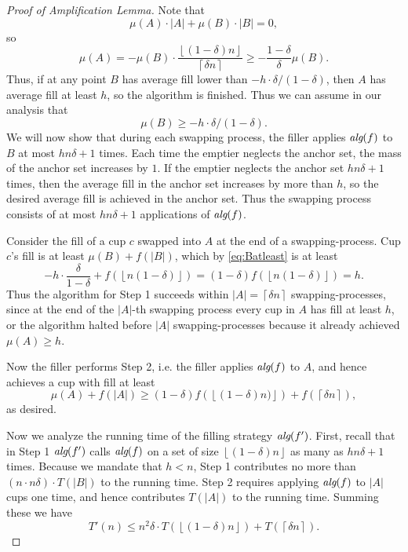 \documentclass[twocolumn]{article}[10pt]
\newcommand{\alg}[1]{\textit{\text{alg}}({#1})}
\newcommand{\floor}[1]{\left\lfloor #1 \right\rfloor}
\newcommand{\ceil}[1]{\left\lceil #1 \right\rceil}
\begin{document}
\begin{proof}[Proof of Amplification Lemma]
  Note that $$\mu(A) \cdot |A| + \mu(B)\cdot |B| = 0,$$ so
  $$\mu(A) = - \mu(B) \cdot
  \frac{\floor{(1-\delta)n}}{\ceil{\delta n}} \ge -
  \frac{1-\delta}{\delta} \mu(B).$$ Thus, if at any
  point $B$ has average fill lower than $-h \cdot
  \delta/(1-\delta)$, then $A$ has average fill at least $h$, so
  the algorithm is finished. Thus we can assume in our analysis that
  \begin{equation}
    \mu(B) \ge -h\cdot\delta/(1-\delta).
  \label{eq:Batleast}
  \end{equation}
  We will now show that during each swapping process, the filler
  applies $\alg{f}$ to $B$ at most $h n \delta + 1$ times. 
  Each time the emptier neglects the anchor set, the mass of the
  anchor set increases by $1$. If the emptier neglects the anchor set $h
  n\delta + 1$ times, then the average fill in the anchor set increases by
  more than $h$, so the desired average fill is achieved in the
  anchor set. Thus the swapping process consists of at most
  $hn\delta + 1$ applications of $\alg{f}$.  

  Consider the fill of a cup $c$ swapped into $A$ at the end of a
  swapping-process. Cup $c$'s fill is at least $\mu(B) + f(|B|)$,
  which by \eqref{eq:Batleast} is at least
  $$-h \cdot \frac{\delta}{1-\delta} + f(\floor{n (1-\delta)}) =
  (1-\delta)f(\floor{n (1-\delta)}) = h.$$ 
  Thus the algorithm for Step 1 succeeds within $|A| =
  \ceil{\delta n}$ swapping-processes, since at the end of the $|A|$-th
  swapping process every cup in $A$ has fill at least $h$, or
  the algorithm halted before $|A|$ swapping-processes because it
  already achieved $\mu(A) \ge h$. 
  
  Now the filler performs Step 2, i.e. the filler applies
  $\alg{f}$ to $A$, and hence achieves a cup with fill at least 
  $$\mu(A) + f(|A|) \ge (1-\delta)f(\floor{(1-\delta)n)}) + f(\ceil{\delta n}),$$
  as desired.

  Now we analyze the running time of the filling strategy
  $\alg{f'}$. First, recall that in Step 1 $\alg{f'}$ calls $\alg{f}$ on a
  set of size $\floor{(1-\delta)n}$ as many as $hn\delta +1$ times.
  Because we mandate that $h < n$, Step 1 contributes no more
  than $(n\cdot n\delta) \cdot T(|B|)$ to the running time.
  Step 2 requires applying $\alg{f}$ to $|A|$ cups one time, and hence
  contributes $T(|A|)$ to the running time. Summing these we have
  $$T'(n) \le n^2\delta \cdot T(\floor{(1-\delta)n}) + T(\ceil{\delta n}).$$

\end{proof}
\end{document}

